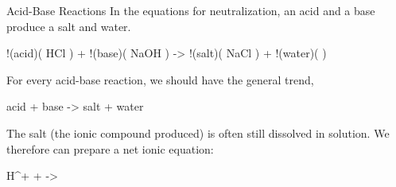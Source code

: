 \documentclass[notes=only]{beamer}
\begin{document}
%
%
%	

\begin{frame}{Acid-Base Reactions}
	In the equations for neutralization, an acid and a base produce a salt
	and water.
			\begin{reaction*}
				!(acid)( HCl\aq{} ) + !(base)( NaOH\aq{} ) ->
				!(salt)( NaCl\aq{} ) + !(water)( \water\lqd{} )
			\end{reaction*}

	For \alert{every} acid-base reaction, we should have the general trend,
			\begin{reaction*}
				acid + base -> salt + water
			\end{reaction*}

	The \alert{salt} (the ionic compound produced) is often still dissolved
	in solution. We therefore can prepare a
			\alert{net ionic equation}:
			\begin{reaction*}
				H^{+}\aq{} + \Hyd\aq{} -> \water\lqd{}
			\end{reaction*}
\end{frame}
\end{document}
